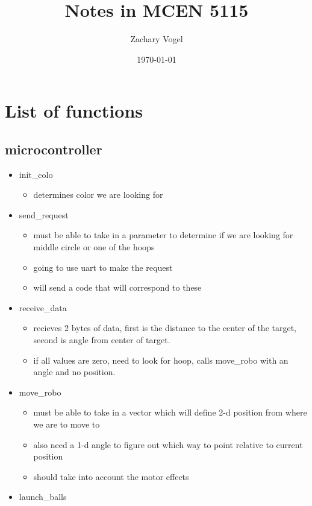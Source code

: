 \documentclass{article}
\author{Zachary Vogel}
\date{\today}
\title{Notes in MCEN 5115}
\begin{document}
\maketitle


\section*{List of functions}
\subsection*{microcontroller}
\begin{itemize}
    \item init\_colo
        \begin{itemize}
            \item determines color we are looking for
        \end{itemize}
    \item send\_request
        \begin{itemize}
            \item must be able to take in a parameter to determine if we are looking for middle circle or one of the hoops
            \item going to use uart to make the request
            \item will send a code that will correspond to these
        \end{itemize}
    \item receive\_data
        \begin{itemize}
            \item recieves 2 bytes of data, first is the distance to the center of the target, second is angle from center of target.
            \item if all values are zero, need to look for hoop, calls move\_robo with an angle and no position.
        \end{itemize}
    \item move\_robo
        \begin{itemize}
            \item must be able to take in a vector which will define 2-d position from where we are to move to
            \item also need a 1-d angle to figure out which way to point relative to current position
            \item should take into account the motor effects
        \end{itemize}
    \item launch\_balls

\end{itemize}
\end{document}

